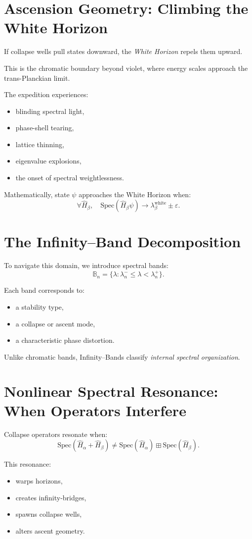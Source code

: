 \section{Ascension Geometry: Climbing the White Horizon}
If collapse wells pull states downward, the \emph{White Horizon} repels them upward.

This is the chromatic boundary beyond violet, where energy scales approach the trans-Planckian limit.

The expedition experiences:
\begin{itemize}
  \item blinding spectral light,
  \item phase-shell tearing,
  \item lattice thinning,
  \item eigenvalue explosions,
  \item the onset of spectral weightlessness.
\end{itemize}

Mathematically, state $\psi$ approaches the White Horizon when:
\[
\forall \hat{H}_\beta,\quad
\mathrm{Spec}(\hat{H}_\beta\psi)
\to
\lambda_\beta^{\text{white}} \pm \varepsilon.
\]

\section{The Infinity--Band Decomposition}
To navigate this domain, we introduce spectral bands:
\[
\mathbb{B}_n =
\{\lambda : \lambda_n^{-} \le \lambda < \lambda_n^{+}\}.
\]

Each band corresponds to:
\begin{itemize}
  \item a stability type,
  \item a collapse or ascent mode,
  \item a characteristic phase distortion.
\end{itemize}

Unlike chromatic bands, Infinity--Bands classify \emph{internal spectral organization}.

\section{Nonlinear Spectral Resonance: When Operators Interfere}
Collapse operators resonate when:
\[
\mathrm{Spec}(\hat{H}_\alpha + \hat{H}_\beta)
\neq
\mathrm{Spec}(\hat{H}_\alpha)
\boxplus
\mathrm{Spec}(\hat{H}_\beta).
\]

This resonance:
\begin{itemize}
  \item warps horizons,
  \item creates infinity-bridges,
  \item spawns collapse wells,
  \item alters ascent geometry.
\end{itemize}

